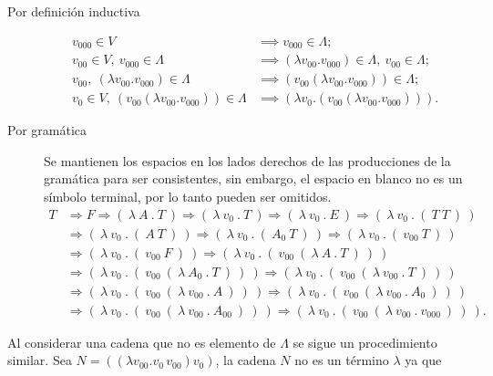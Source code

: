   \begin{description}
  \item[Por definición inductiva]
    \begin{align*}
      v_{000} \in V &\implies v_{000} \in Λ; \\
      v_{00} \in V,\ v_{000} \in Λ &\implies (λv_{00}.v_{000}) \in Λ,\ v_{00} \in Λ; \\
      v_{00},\ (λv_{00}.v_{000}) \in Λ &\implies (v_{00} (λv_{00}.v_{000})) \in Λ; \\
      v_{0} \in V,\ (v_{00} (λv_{00}.v_{000})) \in Λ &\implies (λv_{0}.(v_{00} (λv_{00}.v_{000}))).
    \end{align*}
  \item[Por gramática] Se mantienen los espacios en los lados derechos de las producciones de la gramática para ser consistentes, sin embargo, el espacio en blanco no es un símbolo terminal, por lo tanto pueden ser omitidos.
    \begin{align*}
      T &\Rightarrow F \Rightarrow (\ λ\ A\ .\ T\ ) \Rightarrow (\ λ\ v_{0}\ .\ T\ ) \Rightarrow (\ λ\ v_{0}\ .\ E\ ) \Rightarrow (\ λ\ v_{0}\ .\ (\ T\ T\ )\ ) \\
        &\Rightarrow (\ λ\ v_{0}\ .\ (\ A\ T\ )\ ) \Rightarrow (\ λ\ v_{0}\ .\ (\ A_{0}\ T\ )\ ) \Rightarrow (\ λ\ v_{0}\ .\ (\ v_{00}\ T\ )\ ) \\
        &\Rightarrow (\ λ\ v_{0}\ .\ (\ v_{00}\ F\ )\ ) \Rightarrow (\ λ\ v_{0}\ .\ (\ v_{00}\ (\ λ\ A\ .\ T\ )\ )\ ) \\
        &\Rightarrow (\ λ\ v_{0}\ .\ (\ v_{00}\ (\ λ\ A_{0}\ .\ T\ )\ )\ ) \Rightarrow (\ λ\ v_{0}\ .\ (\ v_{00}\ (\ λ\ v_{00}\ .\ T\ )\ )\ ) \\
        &\Rightarrow (\ λ\ v_{0}\ .\ (\ v_{00}\ (\ λ\ v_{00}\ .\ A\ )\ )\ ) \Rightarrow (\ λ\ v_{0}\ .\ (\ v_{00}\ (\ λ\ v_{00}\ .\ A_{0}\ )\ )\ ) \\
        &\Rightarrow (\ λ\ v_{0}\ .\ (\ v_{00}\ (\ λ\ v_{00}\ .\ A_{00}\ )\ )\ ) \Rightarrow (\ λ\ v_{0}\ .\ (\ v_{00}\ (\ λ\ v_{00}\ .\ v_{000}\ )\ )\ ).
    \end{align*}
  \end{description}

Al considerar una cadena que no es elemento de $ Λ $ se sigue un procedimiento similar. Sea $ N = ((λv_{00}.v_{0}\, v_{00}) v_{0}) $, la cadena $ N $ no es un término $ λ $ ya que

